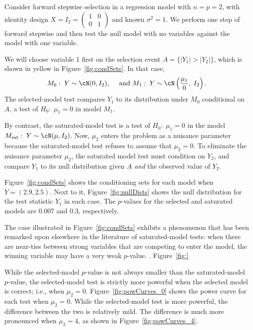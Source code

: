 \documentclass{article}
\begin{document}
\begin{example}
  Consider forward stepwise selection in a regression model with $n=p=2$, with identity design $X = I_2=\begin{pmatrix} 1 & 0 \\ 0 & 1\end{pmatrix}$ and known $\sigma^2=1$. We perform one step of forward stepwise and then test the null model with no variables against the model with one variable. 

We will choose variable 1 first on the selection event $A=\{|Y_1| > |Y_2|\}$, which is shown in yellow in Figure~\ref{fig:condSets}. In that case,
\[
M_0:\; Y\sim \cN(0,I_2), \quad\text{ and } 
M_1:\; Y \sim \cN\left(\frac{\mu_1}{0}, \; I_2\right).
\]
The selected-model test compares $Y_1$ to its distribution under $M_0$ conditional on $A$, a test of $H_0:\;\mu_1=0$ in model $M_1$.

By contrast, the saturated-model test is a test of $H_0:\; \mu_1=0$ in the model $M_{\text{sat}}:\; Y \sim \cN(\mu, I_2)$. Now, $\mu_2$ enters the problem as a nuisance parameter because the saturated-model test refuses to assume that $\mu_2=0$. To eliminate the nuisance parameter $\mu_2$, the saturated model test must condition on $Y_2$, and compare $Y_1$ to its null distribution given $A$ {\em and} the observed value of $Y_2$.

Figure~\ref{fig:condSets} shows the conditioning sets for each model when $Y=(2.9,2.5)$. Next to it, Figure~\ref{fig:nullDists} shows the null distribution for the test statistic $Y_1$ in each case. The $p$-values for the selected and saturated models are 0.007 and 0.3, respectively.
\end{example}

The case illustrated in Figure~\ref{fig:condSets} exhibits a phenomenon that has been remarked upon elsewhere in the literature of saturated-model tests: when there are near-ties between strong variables that are competing to enter the model, the winning variable may have a very weak $p$-value. . Figure~\ref{fig:}


While the selected-model $p$-value is not always smaller than the saturated-model $p$-value, the selected-model test is strictly more powerful when the selected model is correct; i.e., when $\mu_2=0$. Figure~\ref{fig:powCurves_0} shows the power curve for each test when $\mu_2=0$. While the selected-model test is more powerful, the difference between the two is relatively mild. The difference is much more pronounced when $\mu_2=4$, as shown in Figure~\ref{fig:powCurves_4}. 
\end{document}
